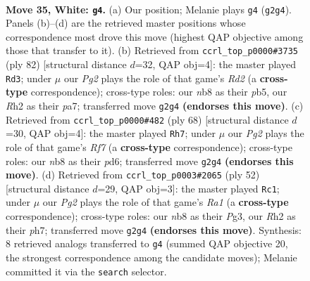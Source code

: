 \documentclass[11pt]{article}
\begin{document}
\clearpage

\begin{figure}[p]\centering
\begin{subfigure}{0.46\textwidth}\centering
\resizebox{\linewidth}{!}{%
\newchessgame
\chessboard[
  setfen={1n3r2/5k2/1p1p4/1P1P4/p1p5/7P/1P1K2PR/8 w - - 4 35},
  showmover=false,
  pgfstyle=straightmove, color=movearrow, markmove={g2-g4}
]}
\caption{}
\end{subfigure}\hfill
\begin{subfigure}{0.46\textwidth}\centering
\resizebox{\linewidth}{!}{%
\newchessgame
\chessboard[
  setfen={8/p7/3p4/1p1P4/4rk1p/1P5P/P2R1KP1/8 w - - 0 42},
  showmover=false,
  pgfstyle=straightmove, color=movearrow, markmove={d2-d3}
]}
\caption{}
\end{subfigure}
\\[4pt]
\begin{subfigure}{0.46\textwidth}\centering
\resizebox{\linewidth}{!}{%
\newchessgame
\chessboard[
  setfen={2k1r3/5R2/2pp3p/p7/3P3P/2P3K1/1P6/8 w - - 0 35},
  showmover=false,
  pgfstyle=straightmove, color=movearrow, markmove={f7-h7}
]}
\caption{}
\end{subfigure}\hfill
\begin{subfigure}{0.46\textwidth}\centering
\resizebox{\linewidth}{!}{%
\newchessgame
\chessboard[
  setfen={8/p1pk1r1p/6p1/3pP3/8/1P2K1P1/P6P/R7 w - - 2 27},
  showmover=false,
  pgfstyle=straightmove, color=movearrow, markmove={a1-c1}
]}
\caption{}
\end{subfigure}
\caption{\textbf{Move 35, White: \texttt{g4}.} (a) Our position; Melanie plays \texttt{g4} (\texttt{g2g4}). Panels (b)--(d) are the retrieved master positions whose correspondence most drove this move (highest QAP objective among those that transfer to it). (b) Retrieved from \texttt{ccrl\_top\_p0000\#3735} (ply 82) [structural distance $d$=32, QAP obj=4]: the master played \texttt{Rd3}; under $\mu$ our \emph{Pg2} plays the role of that game's \emph{Rd2} (a \textbf{cross-type} correspondence); cross-type roles: our \emph{n}b8 as their \emph{p}b5, our \emph{R}h2 as their \emph{p}a7; transferred move \texttt{g2g4} \textbf{(endorses this move)}. (c) Retrieved from \texttt{ccrl\_top\_p0000\#482} (ply 68) [structural distance $d$=30, QAP obj=4]: the master played \texttt{Rh7}; under $\mu$ our \emph{Pg2} plays the role of that game's \emph{Rf7} (a \textbf{cross-type} correspondence); cross-type roles: our \emph{n}b8 as their \emph{p}d6; transferred move \texttt{g2g4} \textbf{(endorses this move)}. (d) Retrieved from \texttt{ccrl\_top\_p0003\#2065} (ply 52) [structural distance $d$=29, QAP obj=3]: the master played \texttt{Rc1}; under $\mu$ our \emph{Pg2} plays the role of that game's \emph{Ra1} (a \textbf{cross-type} correspondence); cross-type roles: our \emph{n}b8 as their \emph{P}g3, our \emph{R}h2 as their \emph{p}h7; transferred move \texttt{g2g4} \textbf{(endorses this move)}. Synthesis: 8 retrieved analogs transferred to \texttt{g4} (summed QAP objective 20, the strongest correspondence among the candidate moves); Melanie committed it via the \texttt{search} selector.}
\label{fig:thought-m68}
\end{figure}
\end{document}
